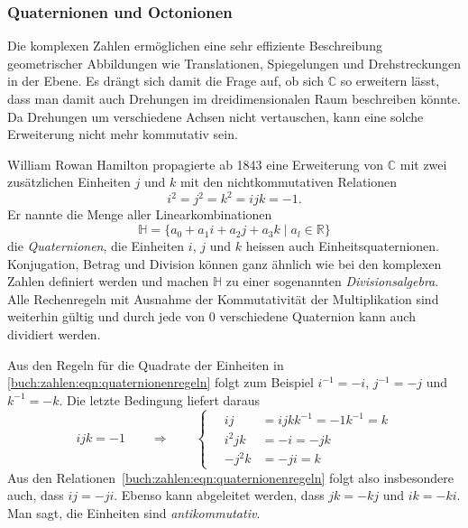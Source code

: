 \subsubsection{Quaternionen und Octonionen}
Die komplexen Zahlen ermöglichen eine sehr effiziente Beschreibung 
geometrischer Abbildungen wie Translationen, Spiegelungen und 
Drehstreckungen in der Ebene.
Es drängt sich damit die Frage auf, ob sich $\mathbb{C}$ so erweitern
lässt, dass man damit auch Drehungen im dreidimensionalen Raum
beschreiben könnte.
Da Drehungen um verschiedene Achsen nicht vertauschen, kann eine solche
Erweiterung nicht mehr kommutativ sein.

William Rowan Hamilton propagierte ab 1843 eine Erweiterung von $\mathbb{C}$
%
mit zwei zusätzlichen Einheiten $j$ und $k$ mit den nichtkommutativen
Relationen
\begin{equation}
i^2 = j^2 = k^2 = i\!jk = -1.
\label{buch:zahlen:eqn:quaternionenregeln}
\end{equation}
Er nannte die Menge aller Linearkombinationen 
\[
\mathbb{H} = \{ a_0+a_1i+a_2j+a_3k\;|\; a_l\in \mathbb{R}\}
\]
die {\em Quaternionen}, die Einheiten $i$, $j$ und $k$ heissen auch
%
Einheitsquaternionen.
%
Konjugation, Betrag und Division können ganz ähnlich wie bei den
%
%
%
komplexen Zahlen definiert werden und machen $\mathbb{H}$ zu einer
sogenannten {\em Divisionsalgebra}.
%
Alle Rechenregeln mit Ausnahme der Kommutativität der Multiplikation
sind weiterhin gültig und durch jede von $0$ verschiedene Quaternion
kann auch dividiert werden.

Aus den Regeln für die Quadrate der Einheiten in
\eqref{buch:zahlen:eqn:quaternionenregeln} folgt zum Beispiel
$i^{-1}=-i$, $j^{-1}=-j$ und $k^{-1}=-k$.
Die letzte Bedingung liefert daraus
\[
i\!jk=-1
\qquad\Rightarrow\qquad
\left\{
\quad
\begin{aligned}
i\!j
&=
i\!jkk^{-1}=-1k^{-1}=k
\\
i^2\!jk&=-i=-jk
\\
-j^2k&=-ji=k
\end{aligned}
\right.
\]
Aus den Relationen~\eqref{buch:zahlen:eqn:quaternionenregeln}
folgt also insbesondere auch, dass $i\!j=-ji$.
Ebenso kann abgeleitet werden, dass $jk=-k\!j$ und $ik=-ki$.
Man sagt, die Einheiten sind {\em antikommutativ}.
%

